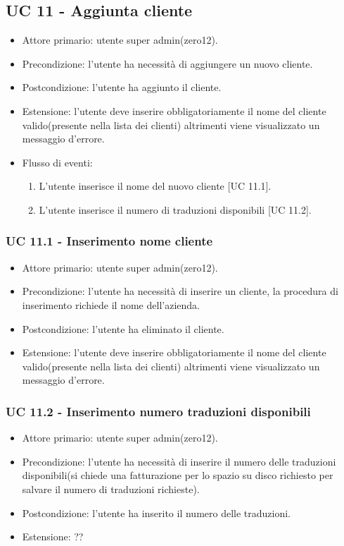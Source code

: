 \subsection{UC 11 - Aggiunta cliente}
    \begin{itemize}
        \item Attore primario: utente super admin(zero12).
        \item Precondizione: l'utente ha necessità di aggiungere un nuovo cliente.
        \item Postcondizione: l'utente ha aggiunto il cliente.
        \item Estensione: l'utente deve inserire obbligatoriamente il nome del cliente valido(presente nella lista dei clienti) altrimenti viene visualizzato un messaggio d'errore.
        \item Flusso di eventi:
        \begin{enumerate}
            \item L'utente inserisce il nome del nuovo cliente [UC 11.1].
            \item L'utente inserisce il numero di traduzioni disponibili [UC 11.2].
        \end{enumerate}
    \end{itemize}
    \subsubsection{UC 11.1 - Inserimento nome cliente}
        \begin{itemize}
            \item Attore primario: utente super admin(zero12).
            \item Precondizione: l'utente ha necessità di inserire un cliente, la procedura di inserimento richiede il nome dell'azienda.
            \item Postcondizione: l'utente ha eliminato il cliente.
            \item Estensione: l'utente deve inserire obbligatoriamente il nome del cliente valido(presente nella lista dei clienti) altrimenti viene visualizzato un messaggio d'errore.
        \end{itemize}
    \subsubsection{UC 11.2 - Inserimento numero traduzioni disponibili}
        \begin{itemize}
            \item Attore primario: utente super admin(zero12).
            \item Precondizione: l'utente ha necessità di inserire il numero delle traduzioni disponibili(si chiede una fatturazione per lo spazio su disco richiesto per salvare il numero di traduzioni richieste).
            \item Postcondizione: l'utente ha inserito il numero delle traduzioni.
            \item Estensione: ??
        \end{itemize}
